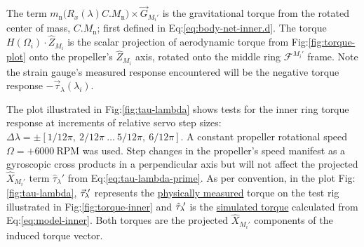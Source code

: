 The term $m_\text{n}\big(R_x(\lambda)C.M_{\text{n}}\big)\times\vec{G}_{M_i'}$ is the gravitational torque from the rotated center of mass, $C.M_{\text{n}}$; first defined in Eq:\ref{eq:body-net-inner.d}. The torque $H(\Omega_i)\cdot\hat{Z}_{M_i}$ is the scalar projection of aerodynamic torque from Fig:\ref{fig:torque-plot} onto the propeller's $\hat{Z}_{M_i}$ axis, rotated onto the middle ring $\mathcal{F}^{M_i'}$ frame. Note the strain gauge's measured response encountered will be the negative torque response $-\vec{\tau}_\lambda(\lambda_i)$.
\par
The plot illustrated in Fig:\ref{fig:tau-lambda} shows tests for the inner ring torque response at increments of relative servo step sizes: $\Delta\lambda=\pm[1/12\pi,~2/12\pi~\ldots~5/12\pi,~6/12\pi]$. A constant propeller rotational speed $\Omega=+6000~\text{RPM}$ was used. Step changes in the propeller's speed manifest as a gyroscopic cross products in a perpendicular axis but will not affect the projected $\hat{X}_{M_i'}$ term $\hat{\tau}_\lambda'$ from Eq:\ref{eq:tau-lambda-prime}. As per convention, in the plot Fig:\ref{fig:tau-lambda}, $\vec{\tau}_\lambda\text{}\hspace{-2pt}'$ represents the \underline{physically measured} torque on the test rig illustrated in Fig:\ref{fig:torque-inner} and $\hat{\tau}_\lambda\text{}\hspace{-2pt}'$ is the \underline{simulated torque} calculated from Eq:\ref{eq:model-inner}. Both torques are the projected $\hat{X}_{M_i'}$ components of the induced torque vector. 
\par
